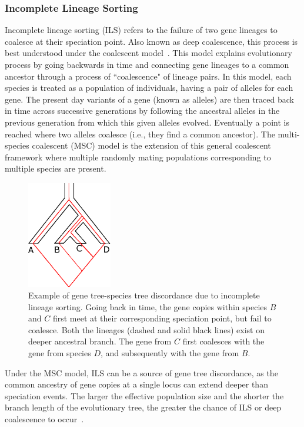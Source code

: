 \subsubsection{Incomplete Lineage Sorting}

Incomplete lineage sorting (ILS) refers to the failure of two gene lineages to coalesce at their speciation point. Also known as deep coalescence, this process is best understood under the coalescent model~\cite{degnan2006discordance, degnan2005gene}. This model explains evolutionary process by going backwards in time and connecting gene lineages to a common ancestor through a process of ``coalescence" of lineage pairs. In this model, each species is treated as a population of individuals, having a pair of alleles for each gene. The present day variants of a gene (known as alleles) are then traced back in time across successive generations by following the ancestral alleles in the previous generation from which this given alleles evolved. Eventually a point is reached where two alleles coalesce (i.e., they find a common ancestor). The multi-species coalescent (MSC) model is the extension of this general coalescent framework where multiple randomly mating populations corresponding to multiple species are present.
\begin{figure}[!tb]
	\centering
	\includegraphics[width=0.33\textwidth]{Figure/ils.eps}
	\caption[Example of gene tree-species tree discordance due to incomplete lineage sorting.]{Example of gene tree-species tree discordance due to incomplete lineage sorting. Going back in time, the gene copies within species $B$ and $C$ first meet at their corresponding speciation point, but fail to coalesce. Both the lineages (dashed and solid black lines) exist on deeper ancestral branch. The gene from $C$ first coalesces with the gene from species $D$, and subsequently with the gene from $B$.
	}
	\label{fig:ils}
\end{figure}
Under the MSC model, ILS can be a source of gene tree discordance, as the common ancestry of gene copies at a single locus can extend deeper than speciation events. The larger the effective population size and the shorter the branch length of the evolutionary tree, the greater the chance of ILS or deep coalescence to occur~\cite{maddison1997gene}.

